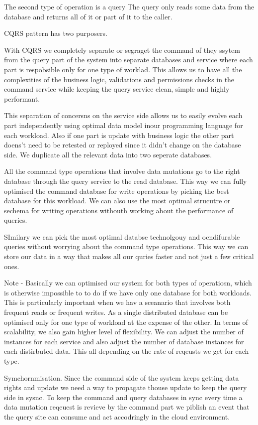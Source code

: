 \documentclass[a4paper, 11pt]{book}
\begin{document}
    The second type of operation is a query
    The query only reads some data from the database and returns all of it or part of it to the caller.

    CQRS pattern has two purposers.

    With CQRS we completely separate or segraget the command of they ssytem from the query part of the system into separate databases and service where each part is respobsible only for one type of worklad.
    This allows us to have all the complexities of the business logic, validations and permissions checks in the command service while keeping the query service clean, simple and highly performant.

    This separation of concersns on the service side allows us to easily evolve each part independently using optimal data model inour programming language for each workload.
    Also if one part is update with business logic the other part doens't need to be retested or reployed since it didn't change on the database side.
    We duplicate all the relevant data into two seperate databases.

    All the command type operations that involve data mutations go to the right database through the query service to the read database.
    This way we can fully optimised the command database for write operations by picking the best database for this workload.
    We can also use the most optimal strucutre or sechema for writing operations withouth working about the performance of queries.

    SImilary we can pick the most optimal databse technolgouy and ocndifurable queries without worrying about the command type operations.
    This way we can store our data in a way that makes all our quries faster and not just a few critical ones.

    Note - Basically we can optimised our system for both types of operatiosn, which is otherwise impossible to to do if we have only one database for both workloads.
    This is particularly important when we hav a sceanario that involves both frequent reads or frequent writes.
    As a single distributed database can be optimised only for one type of workload at the expense of the other.
    In terms of scalability, we also gain higher level of flexibility.
    We can adjust the number of instances for each service and also adjust the number of database instances for each distirbuted data.
    This all depending on the rate of reqeusts we get for each type.


    Symchornmisation.
    Since the command side of the system keeps getting data rights and update we need a way to propagate thouse update to keep the query side in sysnc.
    To keep the command and query databases in sync every time a data mutation reqeuest is revieve by the command part we piblish an event that the query site can consume and act accodringly in the cloud environment.
\end{document}
